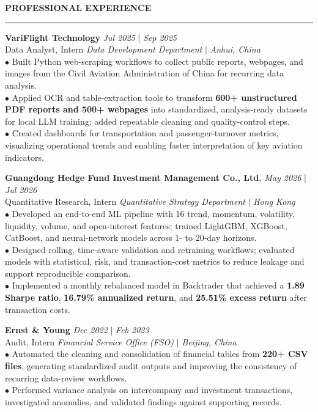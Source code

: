 \documentclass{../original_CV/resume}
\renewcommand{\sectionskip}{\vspace{0.10cm}}
\renewcommand{\sectionlineskip}{\vspace{0.10cm}}
\renewenvironment{rSection}[1]{
\sectionskip
\textcolor{UC San Diego Blue}{\textbf{\large\bfseries\MakeUppercase{#1}}}
\sectionlineskip
\hrule
\begin{list}{}{
\setlength{\leftmargin}{0em}
}
\item[]
}{
\end{list}
}
\begin{document}
\begin{rSection}{PROFESSIONAL EXPERIENCE}
\noindent
\textbf{VariFlight Technology} \hfill {\em Jul 2025} | {\em Sep 2025} \\
Data Analyst, Intern \hfill \textit{Data Development Department} $|$ \textit{Anhui, China} \\[4pt]
$\bullet$ Built Python web-scraping workflows to collect public reports, webpages, and images from the Civil Aviation Administration of China for recurring data analysis.\\[1.5pt]
$\bullet$ Applied OCR and table-extraction tools to transform \textbf{600+ unstructured PDF reports and 500+ webpages} into standardized, analysis-ready datasets for local LLM training; added repeatable cleaning and quality-control steps.\\[1.5pt]
$\bullet$ Created dashboards for transportation and passenger-turnover metrics, visualizing operational trends and enabling faster interpretation of key aviation indicators.

\textbf{Guangdong Hedge Fund Investment Management Co., Ltd.} \hfill {\em May 2026} | {\em Jul 2026} \\
Quantitative Research, Intern \hfill \textit{Quantitative Strategy Department} $|$ \textit{Hong Kong} \\[4pt]
$\bullet$ Developed an end-to-end ML pipeline with 16 trend, momentum, volatility, liquidity, volume, and open-interest features; trained LightGBM, XGBoost, CatBoost, and neural-network models across 1- to 20-day horizons.\\[1.5pt]
$\bullet$ Designed rolling, time-aware validation and retraining workflows; evaluated models with statistical, risk, and transaction-cost metrics to reduce leakage and support reproducible comparison.\\[1.5pt]
$\bullet$ Implemented a monthly rebalanced model in Backtrader that achieved a \textbf{1.89 Sharpe ratio}, \textbf{16.79\% annualized return}, and \textbf{25.51\% excess return} after transaction costs.

\textbf{Ernst \& Young} \hfill {\em Dec 2022} | {\em Feb 2023} \\
Audit, Intern \hfill \textit{Financial Service Office (FSO)} $|$ \textit{Beijing, China} \\[4pt]
$\bullet$ Automated the cleaning and consolidation of financial tables from \textbf{220+ CSV files}, generating standardized audit outputs and improving the consistency of recurring data-review workflows.\\[1.5pt]
$\bullet$ Performed variance analysis on intercompany and investment transactions, investigated anomalies, and validated findings against supporting records.
\end{rSection}
\end{document}
